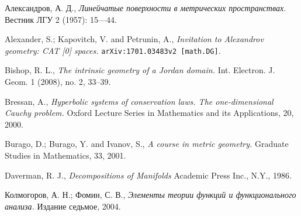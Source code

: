 \documentclass{article}
\begin{document}
\begin{thebibliography}{52}

\begin{otherlanguage}{russian}
Александров, А. Д., 
\textit{Линейчатые поверхности в метрических пространствах.}
Вестник ЛГУ 2 (1957): 15---44.
\end{otherlanguage}

Alexander, S.; Kapovitch, V. and Petrunin, A.,
\textit{Invitation to Alexandrov geometry: CAT [0] spaces.}
\texttt{arXiv:1701.03483v2 [math.DG]}.

Bishop, R. L.,
\textit{The intrinsic geometry of a Jordan domain.}
Int. Electron. J. Geom. 1 (2008), no. 2, 33--39. 

 Bressan, A.,
\textit{Hyperbolic systems of conservation laws.
The one-dimensional Cauchy problem.}
Oxford Lecture Series in Mathematics and its Applications, 20, 2000.

Burago, D.; Burago, Y. and Ivanov, S.,
\textit{A course in metric geometry.}
Graduate Studies in Mathematics, 33, 2001.


 Daverman, R. J.,
\textit{Decompositions of Manifolds}
Academic Press Inc., N.Y., 1986.





\begin{otherlanguage}{russian}
Колмогоров, А. Н.;
Фомин, С. В.,
\textit{Элементы теории функций и функционального анализа.}
Издание седьмое, 2004.
\end{otherlanguage}



\end{thebibliography}
\end{document}

